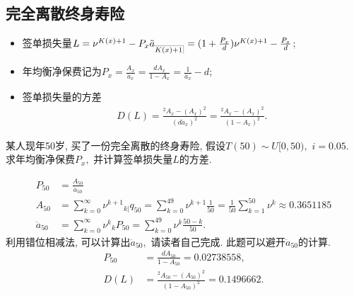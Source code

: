 \documentclass[lang=cn,10pt]{elegantbook}
\makeatletter
\DeclareRobustCommand{\annu}[1]{_{%
    \def\arraystretch{0}%
    \setlength\arraycolsep{1pt}%
    \setlength\arrayrulewidth{.2pt}%
    \begin{array}[b]{@{}c|}\hline
        \\[\arraycolsep]%
        \scriptstyle #1%
    \end{array}%
}}
\makeatother
\begin{document}
\subsection{完全离散终身寿险}
\begin{proposition}
    \begin{itemize}
        \item 签单损失量$L=\nu^{K(x)+1}-P_{x}\ddot{a}_{\annu{K(x)+1}}= (1+\frac{P_{x}}{d})\nu^{K(x)+1}-\frac{P_{x}}{d}$;
        \item 年均衡净保费记为$P_{x}=\frac{A_{x}}{\ddot{a}_{x}}=\frac{dA_{x}}{1-A_{x}}=\frac{1}{\ddot{a}_{x}}-d$;
        \item 签单损失量的方差
        \begin{align*}
        D(L) = \frac{{}^{2}A_{x}-(A_{x})^{2}}{(d\ddot{a}_{x})^{2}}= \frac{{}^{2}A_{x}-(A_{x})^{2}}{(1-A_{x})^{2}}.
        \end{align*}
    \end{itemize}
\end{proposition}

\begin{example}
    某人现年50岁, 买了一份完全离散的终身寿险, 假设$T(50)\sim U[0,50),$ $i=0.05.$ 求年均衡净保费$P_{x},$ 并计算签单损失量$L$的方差.
 \end{example}
 \begin{solution}
 \begin{align*}
 P_{50}&=\frac{A_{50}}{\ddot{a}_{50}}\\
 A_{50}&=\sum^{\infty}_{k=0}\nu^{k+1}{}_{k|}q_{50}=\sum^{49}_{k=0}\nu^{k+1}\frac{1}{50}=\frac{1}{50}\sum^{50}_{k=1}\nu^{k}
 \approx 0.3651185\\
 \ddot{a}_{50}&=\sum^{\infty}_{k=0}\nu^{k}{}_{k}P_{50}=\sum^{49}_{k=0}\nu^{k}\frac{50-k}{50}.
 \end{align*}
 利用错位相减法, 可以计算出$\ddot{a}_{50},$  请读者自己完成. 此题可以避开$\ddot{a}_{50}$的计算.
 \begin{align*}
 P_{50}&=\frac{dA_{50}}{1-A_{50}}=0.02738558,\\
 D(L)&=\frac{^{2}A_{50}-(A_{50})^{2}}{(1-A_{50})^2}= 0.1496662.
 \end{align*}
\end{solution}
\end{document}
